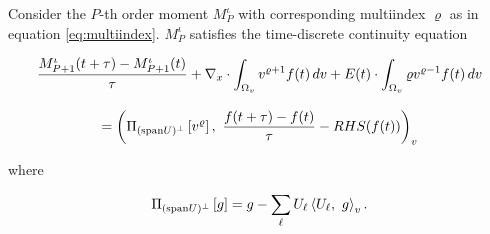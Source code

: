 \begin{theorem}\label{thm:conservation}
    Consider the $P$-th order moment $M_P^\iota$ with corresponding 
    multiindex $\varrho$ as in equation \ref{eq:multiindex}. $M_P^\iota$ 
    satisfies the time-discrete continuity equation 

    \begin{multline}\label{eq:conservation_higher_order}
        \frac{M_{P+1}^\iota (t + \tau) - M_{P+1}^\iota (t)}{\tau} 
        + \nabla_x \cdot \int_{\Omega_v} v^{\varrho + 1} f(t) \,dv 
        + E(t) \cdot \int_{\Omega_v} \varrho v^{\varrho - 1} f(t) \,dv \\[2ex] 
        = \left( 
            \Pi_{(\spn U)^\perp} \left[ v^\varrho \right],\ 
            \frac{f(t + \tau) - f(t)}{\tau} - RHS (f(t))
        \right)_v 
    \end{multline}

    where 

    \begin{equation}
        \Pi_{(\text{span} U)^\perp} \left[ g \right] 
        = g - \sum_\ell U_\ell \left\langle U_\ell,\ g \right\rangle_v . 
    \end{equation}
\end{theorem}

